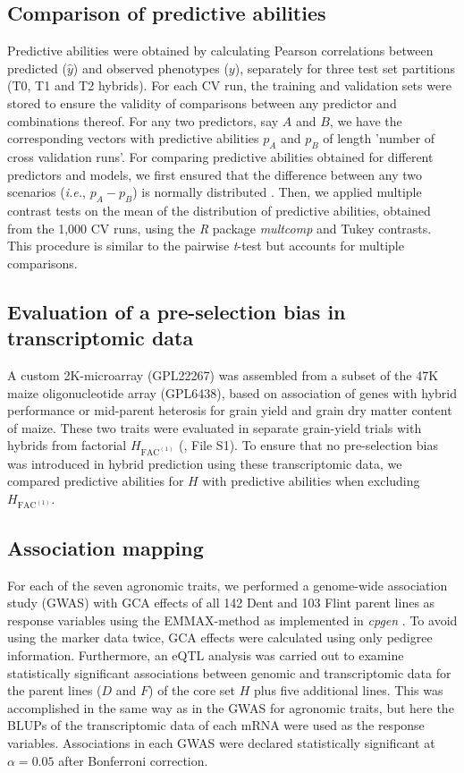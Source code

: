 \documentclass[12pt,titlepage]{article}
\begin{document}
\subsection{Comparison of predictive abilities}
Predictive abilities were obtained by calculating Pearson correlations between
predicted ($\hat{y}$) and observed phenotypes ($y$), separately for three
test set partitions (T0, T1 and T2 hybrids).
For each CV run, the training and validation sets were stored to ensure the
validity of comparisons between any predictor and combinations thereof.
For any two predictors, say $A$ and $B$, we have the corresponding vectors 
with predictive abilities $p_{A}$ and $p_{B}$ of length 'number of cross
validation runs'.
For comparing predictive abilities obtained for different predictors and models,
we first ensured that the difference between any two scenarios (\textit{i.e.}, 
$p_{A} - p_{B}$) is normally distributed \cite{Dietterich1998}.
Then, we applied multiple contrast tests on the mean of the distribution of 
predictive abilities, obtained from the 1,000 CV runs, using the \emph{R} 
package \emph{multcomp} \cite{Hothorn2008} and Tukey contrasts.
This procedure is similar to the pairwise \textit{t}-test \cite{Guo2016} but 
accounts for multiple comparisons.


\subsection{Evaluation of a pre-selection bias in transcriptomic data}
A custom 2K-microarray (GPL22267) was assembled from a subset of the 47K maize 
oligonucleotide array (GPL6438), based on association of genes with hybrid
performance or mid-parent heterosis for grain yield and grain dry matter
content of maize. 
These two traits were evaluated in separate grain-yield trials with hybrids from 
factorial $H_{\text{FAC}^{(1)}}$ (, File S1). 
To ensure that no pre-selection bias was introduced in hybrid prediction using 
these transcriptomic data, we compared predictive abilities for $H$ with 
predictive abilities when excluding $H_{\text{FAC}^{(1)}}$.





\subsection{Association mapping}
For each of the seven agronomic traits, we performed a genome-wide association
study (GWAS) with GCA effects of all 142 Dent and 103 Flint parent lines as
response variables using the EMMAX-method \cite{Kang2010} as implemented in 
\emph{cpgen} \cite{Heuer2015}.
To avoid using the marker data twice, GCA effects were calculated using only
pedigree information.
Furthermore, an eQTL analysis was carried out to examine statistically 
significant associations between genomic and transcriptomic data for the parent
lines ($D$ and $F$) of the core set $H$ plus five additional lines.
This was accomplished in the same way as in the GWAS for agronomic traits, but
here the BLUPs of the transcriptomic data of each mRNA were used as the 
response variables.
Associations in each GWAS were declared statistically significant at 
$\alpha = 0.05$ after Bonferroni correction.
\end{document}
